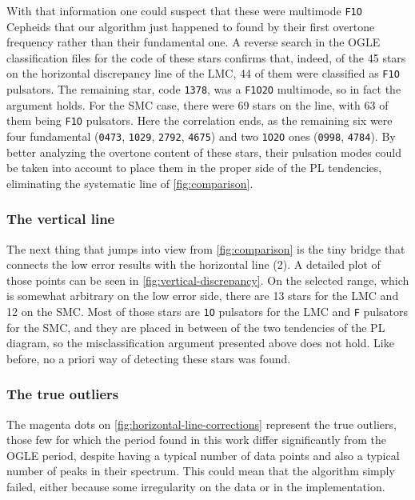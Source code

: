 With that information one could suspect that these were multimode \texttt{F1O} Cepheids 
that our algorithm just happened to found by their first overtone frequency rather than their fundamental one.
A reverse search in the OGLE classification files for the code of these stars confirms that, indeed, 
of the 45 stars on the horizontal discrepancy line of the LMC, 44 of them were classified as \texttt{F1O} pulsators.
The remaining star, code \texttt{1378}, was a \texttt{F1O2O} multimode, so in fact the argument holds.
For the SMC case, there were 69 stars on the line, with 63 of them being \texttt{F1O} pulsators.
Here the correlation ends, as the remaining six were four fundamental (\texttt{0473}, \texttt{1029}, \texttt{2792}, \texttt{4675}) 
and two \texttt{1O2O} ones (\texttt{0998}, \texttt{4784}).
By better analyzing the overtone content of these stars, 
their pulsation modes could be taken into account to place them in the proper side of the PL tendencies,
eliminating the systematic line of \autoref{fig:comparison}.

\subsubsection{The vertical line}

The next thing that jumps into view from \autoref{fig:comparison} is the tiny bridge 
that connects the low error results with the horizontal line (2).
A detailed plot of those points can be seen in \autoref{fig:vertical-discrepancy}. 
On the selected range, which is somewhat arbitrary on the low error side, there are 13 stars for the LMC and 12 on the SMC.
Most of those stars are \texttt{1O} pulsators for the LMC and \texttt{F} pulsators for the SMC, 
and they are placed in between of the two tendencies of the PL diagram, so the misclassification argument presented above does not hold.
Like before, no a priori way of detecting these stars was found.

\subsubsection{The true outliers}

The magenta dots on \autoref{fig:horizontal-line-corrections} represent the true outliers, 
those few for which the period found in this work differ significantly from the OGLE period,
despite having a typical number of data points and also a typical number of peaks in their spectrum.
This could mean that the algorithm simply failed, either because some irregularity on the data or in the implementation. 

